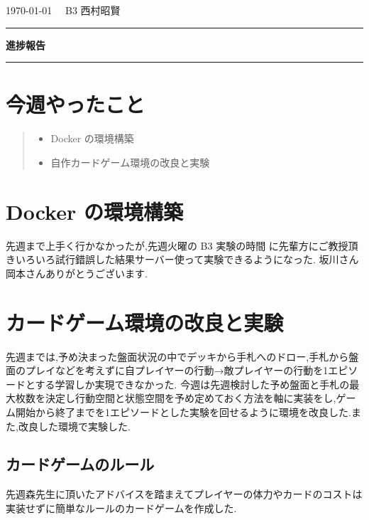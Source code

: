 \documentclass{jarticle}     %
\begin{document}
  \noindent
  \onecolumn
  \hspace{1em}

  \today
  \hfill
  \ \ B3 西村昭賢 

  \vspace{2mm}
  \hrule
  \begin{center}
  {\Large \bf 進捗報告}
  \end{center}
  \hrule
  \vspace{3mm}


\section{今週やったこと}

\begin{quote}
  \begin{itemize}
   \item Docker の環境構築
   \item 自作カードゲーム環境の改良と実験
  \end{itemize}
 \end{quote}


\section{Docker の環境構築}
先週まで上手く行かなかったが,先週火曜の B3 実験の時間
に先輩方にご教授頂きいろいろ試行錯誤した結果サーバー使って実験できるようになった.
坂川さん岡本さんありがとうございます.


\section{カードゲーム環境の改良と実験}
先週までは,予め決まった盤面状況の中でデッキから手札へのドロー,手札から盤面のプレイなどを考えずに自プレイヤーの行動→敵プレイヤーの行動を1エピソードとする学習しか実現できなかった.
今週は先週検討した予め盤面と手札の最大枚数を決定し行動空間と状態空間を予め定めておく方法を軸に実装をし\cite{実装},ゲーム開始から終了までを1エピソードとした実験を回せるように環境を改良した.また,改良した環境で実験した.

\subsection{カードゲームのルール}
先週森先生に頂いたアドバイスを踏まえてプレイヤーの体力やカードのコストは実装せずに簡単なルールのカードゲームを作成した.
\end{document}
